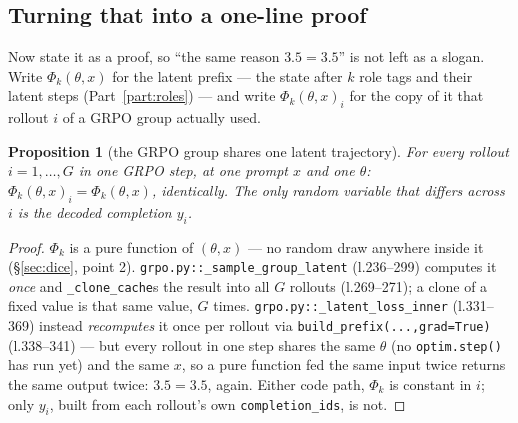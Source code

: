 \documentclass[11pt]{article}
\newtheorem{proposition}[theorem]{Proposition}
\theoremstyle{definition}
\begin{document}
\begin{center}
\end{center}

\subsection{Turning that into a one-line proof}
\label{sec:grpo-shared-latent}

Now state it as a proof, so ``the same reason $3.5=3.5$'' is not left as a slogan. Write $\Phi_k(\theta,x)$ for the latent prefix --- the state after $k$ role tags and their latent steps (Part~\ref{part:roles}) --- and write $\Phi_k(\theta,x)_i$ for the copy of it that rollout $i$ of a GRPO group actually used.

\begin{proposition}[the GRPO group shares one latent trajectory]
\label{prop:shared-latent}
For every rollout $i=1,\dots,G$ in one GRPO step, at one prompt $x$ and one $\theta$: $\Phi_k(\theta,x)_i = \Phi_k(\theta,x)$, identically. The only random variable that differs across $i$ is the decoded completion $y_i$.
\end{proposition}
\begin{proof}
$\Phi_k$ is a pure function of $(\theta,x)$ --- no random draw anywhere inside it (\S\ref{sec:dice}, point 2). \texttt{grpo.py::\_sample\_group\_latent} (l.236--299) computes it \emph{once} and \texttt{\_clone\_cache}s the result into all $G$ rollouts (l.269--271); a clone of a fixed value is that same value, $G$ times. \texttt{grpo.py::\_latent\_loss\_inner} (l.331--369) instead \emph{recomputes} it once per rollout via \texttt{build\_prefix(...,grad=True)} (l.338--341) --- but every rollout in one step shares the same $\theta$ (no \texttt{optim.step()} has run yet) and the same $x$, so a pure function fed the same input twice returns the same output twice: $3.5=3.5$, again. Either code path, $\Phi_k$ is constant in $i$; only $y_i$, built from each rollout's own \texttt{completion\_ids}, is not.
\end{proof}
\end{document}
